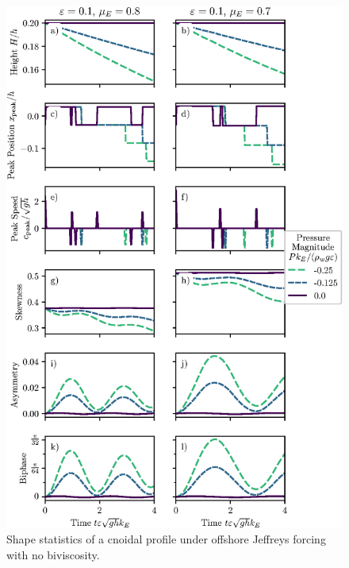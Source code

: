\documentclass{jfm}
\begin{document}
\begin{figure}
  \centering
  \includegraphics{Decaying-no-NuBi.eps}
  \caption{
    Shape statistics of a cnoidal profile under offshore Jeffreys
    forcing with no biviscosity.
  }
\end{figure}
\end{document}
